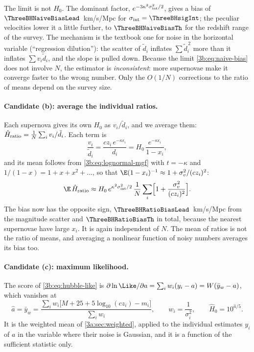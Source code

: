 The limit is not $H_0$. The dominant factor, $e^{-3\kappa^2\sigma_{\rm int}^2/2}$,
gives a bias of $\ThreeBHNaiveBiasLead$~km/s/Mpc for $\sigma_{\rm int}=\ThreeBHsigInt$;
the peculiar velocities lower it a little further, to $\ThreeBHNaiveBiasTh$ for
the redshift range of the survey. The mechanism is the textbook one for noise
in the horizontal variable (``regression dilution''): the scatter of
$\tilde d_i$ inflates $\sum\tilde d_i^{\,2}$ more than it inflates
$\sum v_i\tilde d_i$, and the slope is pulled down. Because the limit
\eqref{3b:eq:naive-bias} does not involve $N$, the estimator is
\emph{inconsistent}: more supernovae make it converge faster to the wrong
number. Only the $O(1/N)$ corrections to the ratio of means depend on the
survey size.

\paragraph{Candidate (b): average the individual ratios.}
Each supernova gives its own $H_0$ as $v_i/\tilde d_i$, and we average them:
$\hat H_{\rm ratio}=\frac1N\sum_iv_i/\tilde d_i$. Each term is
\[
  \frac{v_i}{\tilde d_i}=\frac{cz_i\,e^{-\kappa\epsilon_i}}{d_i}
  =H_0\,\frac{e^{-\kappa\epsilon_i}}{1-x_i},
\]
and its mean follows from \eqref{3b:eq:lognormal-mgf} with $t=-\kappa$ and
$1/(1-x)=1+x+x^2+\dots$, so that $\E(1-x_i)^{-1}\approx1+\sigma_v^2/(cz_i)^2$:
\begin{equation}
  \E\,\hat H_{\rm ratio}\approx H_0\,e^{\kappa^2\sigma_{\rm int}^2/2}\,
  \frac1N\sum_i\Bigl[1+\frac{\sigma_v^2}{(cz_i)^2}\Bigr].
  \label{3b:eq:ratio-bias}
\end{equation}
The bias now has the opposite sign, $\ThreeBHRatioBiasLead$~km/s/Mpc from the
magnitude scatter and $\ThreeBHRatioBiasTh$ in total, because the nearest
supernovae have large $x_i$. It is again independent of $N$. The mean of
ratios is not the ratio of means, and averaging a nonlinear function of noisy
numbers averages its bias too.

\paragraph{Candidate (c): maximum likelihood.}
The score of \eqref{3b:eq:hubble-like} is
$\partial\ln\Like/\partial a=\sum_iw_i(y_i-a)=W(\bar y_w-a)$, which vanishes at
\begin{equation}
  \hat a=\bar y_w=\frac{\sum_iw_i\bigl[M+25+5\log_{10}(cz_i)-m_i\bigr]}{\sum_iw_i},
  \qquad w_i=\frac1{\sigma_i^2},
  \qquad \hat H_0=10^{\hat a/5}.
  \label{3b:eq:hubble-ml}
\end{equation}
It is the weighted mean of \cref{3a:sec:weighted}, applied to the
individual estimates $y_i$ of $a$ in the variable where their noise is
Gaussian, and it is a function of the sufficient statistic only.

